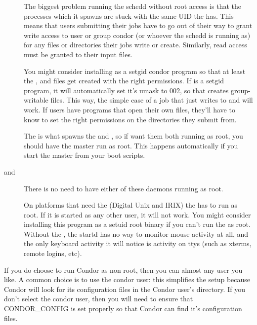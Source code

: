 \begin{description}
\item[] The biggest problem running the schedd
    without root access is that the  processes which it
    spawns are stuck with the same UID the  has.  This
    means that users submitting their jobs have to go out of their way
    to grant write access to user or group condor (or whoever the
    schedd is running as) for any files or directories their jobs
    write or create.  Similarly, read access must be granted to their
    input files.

    You might consider installing  as a setgid condor
    program so that at least the ,  and
     files get created with the right permissions.  If
     is a setgid program, it will automatically set
    it's umask to 002, so that creates group-writable files.  This
    way, the simple case of a job that just writes to 
    and  will work.  If users have programs that open
    their own files, they'll have to know to set the right permissions
    on the directories they submit from.

\item[] The  is what spawns the
     and , so if want them both running
    as root, you should have the master run as root.  This happens
    automatically if you start the master from your boot scripts.

\item[ and ]
There is no need to have either of these daemons running as root.

\item[] On platforms that need the  (Digital
    Unix and IRIX) the  has to run as root.  If it is
    started as any other user, it will not work.  You might consider
    installing this program as a setuid root binary if you can't run
    the  as root.  Without the , the
    startd has no way to monitor mouse activity at all, and the only
    keyboard activity it will notice is activity on ttys (such as
    xterms, remote logins, etc).

\end{description}

If you do choose to run Condor as non-root, then you can almost any
user you like. A common choice is to use the condor user: this
simplifies the setup because Condor will look for its configuration
files in the Condor user's directory. If you don't select the condor
user, then you will need to ensure that CONDOR\_CONFIG is set
properly so that Condor can find it's configuration files. 

